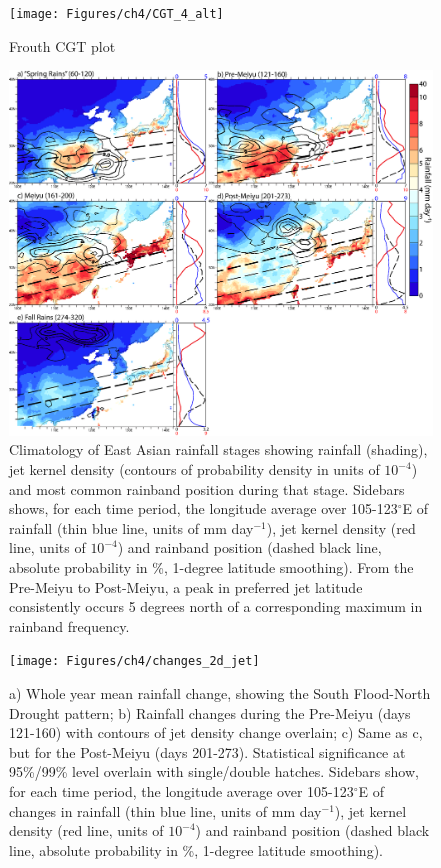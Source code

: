 \begin{figure}
\centering
\noindent\texttt{[image: Figures/ch4/CGT\_4\_alt]}
\caption{Frouth CGT plot}
\label{fig:cgt_u}
\end{figure}

\begin{figure}
\centering
\noindent\includegraphics[width=36pc]{Figures/ch4/climo}
\caption{Climatology of East Asian rainfall stages showing rainfall (shading), jet kernel density (contours of probability density in units of $10^{-4}$) and most common rainband position during that stage. Sidebars shows, for each time period, the longitude average over 105-123$^{\circ}$E of rainfall (thin blue line, units of mm day$^{-1}$), jet kernel density (red line, units of $10^{-4}$) and rainband position (dashed black line, absolute probability in \%, 1-degree latitude smoothing). From the Pre-Meiyu to Post-Meiyu, a peak in preferred jet latitude consistently occurs 5 degrees north of a corresponding maximum in rainband frequency.}
\label{fig:climo}
\end{figure}


\begin{figure}
\centering
\noindent\texttt{[image: Figures/ch4/changes\_2d\_jet]}
\caption{a) Whole year mean rainfall change, showing the South Flood-North Drought pattern; b) Rainfall changes during the Pre-Meiyu (days 121-160) with contours of jet density change overlain; c) Same as c, but for the Post-Meiyu (days 201-273). Statistical significance at 95\%/99\% level overlain with single/double hatches. Sidebars show, for each time period, the longitude average over 105-123$^{\circ}$E of changes in rainfall (thin blue line, units of mm day$^{-1}$), jet kernel density (red line, units of $10^{-4}$) and rainband position (dashed black line, absolute probability in \%, 1-degree latitude smoothing).}
\label{fig:changes_2d}
\end{figure}

